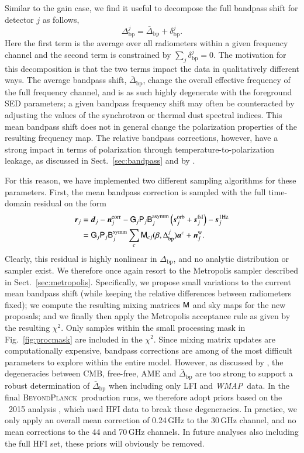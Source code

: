 \documentclass[onecolumn]{aa}
\def\WMAP{\emph{WMAP}}
\renewcommand{\d}[0]{\vec{d}}
\newcommand{\n}[0]{\vec{n}}
\newcommand{\s}[0]{\vec{s}}
\renewcommand{\a}[0]{\vec{a}}
\newcommand{\B}[0]{\tens{B}}
\newcommand{\M}[0]{\tens{M}}
\renewcommand{\r}[0]{\vec{r}}
\renewcommand{\P}[0]{\tens{P}}
\renewcommand{\G}[0]{\tens{G}}
\newcommand{\Dbp}[0]{\Delta_{\mathrm{bp}}}
\newcommand{\BP}{\textsc{BeyondPlanck}}
\begin{document}
Similar to the gain case, we find it useful to decompose the full
bandpass shift for detector $j$ as follows,
\begin{equation}
  \Delta_{\mathrm{bp}}^j = \bar{\Delta}_{\mathrm{bp}} + \delta_{\mathrm{bp}}^j.
\end{equation}
Here the first term is the average over all radiometers within a given
frequency channel and the second term is constrained by $\sum_j
\delta_{\mathrm{bp}}^j = 0$. The motivation for this decomposition is
that the two terms impact the data in qualitatively different
ways. The average bandpass shift, $\bar{\Delta}_{\mathrm{bp}}$, change
the overall effective frequency of the full frequency channel, and is
as such highly degenerate with the foreground SED parameters; a given
bandpass frequency shift may often be counteracted by adjusting the
values of the synchrotron or thermal dust spectral indices. This mean
bandpass shift does not in general change the polarization properties
of the resulting frequency map. The relative bandpass corrections,
however, have a strong impact in terms of polarization through
temperature-to-polarization leakage, as discussed in
Sect.~\ref{sec:bandpass} and by \citet{bp09}.

For this reason, we have implemented two different sampling algorithms
for these parameters. First, the mean bandpass correction is sampled
with the full time-domain residual on the form
\begin{align}
    \r_j &= \d_{j} - \n^{\mathrm{corr}}_{j} - \G_j \P_{j}\B_{j}^{\mathrm{asymm}}\left(\s^{\mathrm{orb}}_{j}  
      + \s^{\mathrm{fsl}}_{j} \right) - \s^{\mathrm{1Hz}}_j \\ &= \G_{j}\P_{j}\B_{j}^{\mathrm{symm}}\sum_{c}
      \M_{cj}(\beta, \Dbp^{j})\a^c  + \n^{\mathrm{w}}_{j}.
      \label{eq:res_bp}
\end{align}
Clearly, this residual is highly nonlinear in $\Delta_{\mathrm{bp}}$,
and no analytic distribution or sampler exist. We therefore once again
resort to the Metropolis sampler described in
Sect.~\ref{sec:metropolis}. Specifically, we propose small variations
to the current mean bandpass shift (while keeping the relative
differences between radiometers fixed); we compute the resulting
mixing matrices $\M$ and sky maps for the new proposals; and we
finally then apply the Metropolis acceptance rule as given by the
resulting $\chi^2$. Only samples within the small processing mask in
Fig.~\ref{fig:procmask} are included in the $\chi^2$. Since mixing
matrix updates are computationally expensive, bandpass corrections are
among of the most difficult parameters to explore within the entire
model. However, as discussed by \citet{bp09}, the degeneracies between
CMB, free-free, AME and $\bar{\Delta}_{\mathrm{bp}}$ are too strong to
support a robust determination of $\bar{\Delta}_{\mathrm{bp}}$ when
including only LFI and \WMAP\ data. In the final \BP\ production runs,
we therefore adopt priors based on the \Planck\ 2015 analysis
\citep{planck2014-a12}, which used HFI data to break these
degeneracies. In practice, we only apply an overall mean correction of
0.24\,GHz to the 30\,GHz channel, and no mean corrections to the 44 and 70\,GHz
channels. In future analyses also including the full HFI set, these
priors will obviously be removed.
\end{document}
